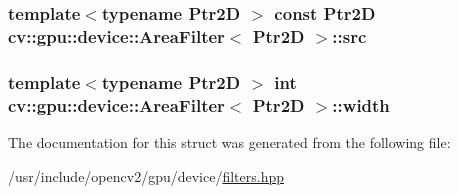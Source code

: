 \hypertarget{structcv_1_1gpu_1_1device_1_1AreaFilter_a94770fe941fc982b70005b0f6d5f618b}{
\subsubsection[{src}]{\setlength{\rightskip}{0pt plus 5cm}template$<$typename Ptr2\-D $>$ const Ptr2\-D {\bf cv\-::gpu\-::device\-::\-Area\-Filter}$<$ Ptr2\-D $>$\-::src}}\label{structcv_1_1gpu_1_1device_1_1AreaFilter_a94770fe941fc982b70005b0f6d5f618b}
\hypertarget{structcv_1_1gpu_1_1device_1_1AreaFilter_adabbae34534014ec806f3459a6372d21}{
\subsubsection[{width}]{\setlength{\rightskip}{0pt plus 5cm}template$<$typename Ptr2\-D $>$ int {\bf cv\-::gpu\-::device\-::\-Area\-Filter}$<$ Ptr2\-D $>$\-::width}}\label{structcv_1_1gpu_1_1device_1_1AreaFilter_adabbae34534014ec806f3459a6372d21}


The documentation for this struct was generated from the following file\-:\begin{DoxyCompactItemize}
\item 
/usr/include/opencv2/gpu/device/\hyperlink{filters_8hpp}{filters.\-hpp}\end{DoxyCompactItemize}
